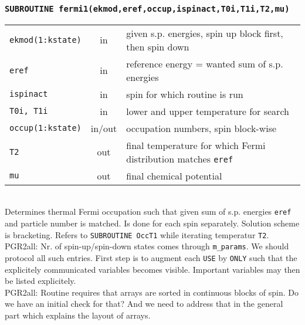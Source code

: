 \documentclass[final,1p]{elsarticle}
\newcommand{\PGRcomm}[1]{{\color{blue}\small PGR2all: #1}}
\begin{document}
\subsubsection*{\tt SUBROUTINE fermi1(ekmod,eref,occup,ispinact,T0i,T1i,T2,mu)}
\begin{tabular}{lcl}
 {\tt ekmod(1:kstate)} & in & given s.p. energies, spin up block first, then
 spin down\\
 {\tt eref}& in & reference energy = wanted sum of s.p. energies\\
 {\tt ispinact}& in & spin for which routine is run\\
 {\tt T0i, T1i}& in & lower and upper temperature for search\\
 {\tt occup(1:kstate)}& in/out & occupation numbers, spin block-wise\\
 {\tt T2} & out & final temperature for which Fermi distribution
 matches {\tt eref} \\
 {\tt mu} & out & final chemical potential\\
\end{tabular}
\\[4pt]
Determines thermal Fermi occupation such that given sum of
s.p. energies {\tt eref} and particle number is matched. Is done for
each spin separately. Solution scheme is bracketing. Refers to 
{\tt SUBROUTINE OccT1} while iterating temperatur {\tt T2}.
\\
\PGRcomm{Nr. of spin-up/spin-down states comes through {\tt m\_params}. 
We should protocol all such entries. First step is to augment each
{\tt USE} by {\tt ONLY} such that the explicitely communicated
variables becomes visible. Important variables may then be listed
explicitely.
}
\\
\PGRcomm{Routine requires that arrays are sorted in continuous blocks of
  spin. Do we have an initial check for that? And we need to address
  that in the general part which explains the layout of arrays.}
\end{document}

